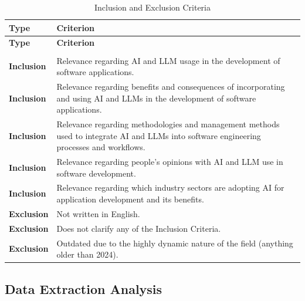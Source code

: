 {\small
\renewcommand{\arraystretch}{1.05}
\setlength{\tabcolsep}{4pt}

\begin{longtable}{
    >{\raggedright\arraybackslash}p{2.2cm}
    >{\raggedright\arraybackslash}p{12.6cm}
}
\caption{Inclusion and Exclusion Criteria}
\label{tab:inclusion_exclusion} \\

\toprule
\textbf{Type} & \textbf{Criterion} \\
\midrule
\endfirsthead

\toprule
\textbf{Type} & \textbf{Criterion} \\
\midrule
\endhead

\midrule
\multicolumn{2}{r}{\textit{Continued on next page}} \\
\bottomrule
\endfoot

\bottomrule
\endlastfoot

\textbf{Inclusion} &
Relevance regarding AI and LLM usage in the development of software applications. \\

\textbf{Inclusion} &
Relevance regarding benefits and consequences of incorporating and using AI and LLMs in the development of software applications. \\

\textbf{Inclusion} &
Relevance regarding methodologies and management methods used to integrate AI and LLMs into software engineering processes and workflows. \\

\textbf{Inclusion} &
Relevance regarding people's opinions with AI and LLM use in software development. \\

\textbf{Inclusion} &
Relevance regarding which industry sectors are adopting AI for application development and its benefits. \\

\textbf{Exclusion} &
Not written in English. \\

\textbf{Exclusion} &
Does not clarify any of the Inclusion Criteria. \\

\textbf{Exclusion} &
Outdated due to the highly dynamic nature of the field (anything older than 2024). \\

\end{longtable}
}


\subsection{Data Extraction Analysis}

